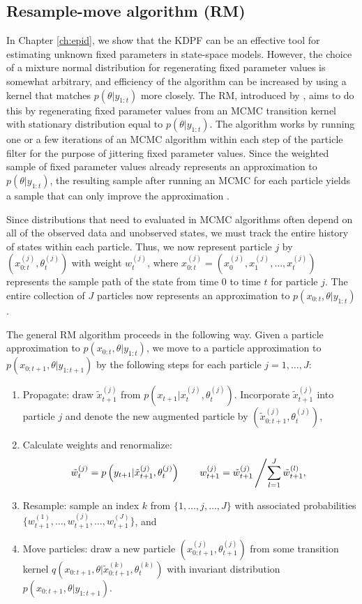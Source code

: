 \subsection{Resample-move algorithm (RM)} \label{sec:rm}

In Chapter \ref{ch:epid}, we show that the KDPF can be an effective tool for estimating unknown fixed parameters in state-space models. However, the choice of a mixture normal distribution for regenerating fixed parameter values is somewhat arbitrary, and efficiency of the algorithm can be increased by using a kernel that matches $p(\theta|y_{1:t})$ more closely. The RM, introduced by \citet{Gilk:Berz:foll:2001}, aims to do this by regenerating fixed parameter values from an MCMC transition kernel with stationary distribution equal to $p(\theta|y_{1:t})$. The algorithm works by running one or a few iterations of an MCMC algorithm within each step of the particle filter for the purpose of jittering fixed parameter values. Since the weighted sample of fixed parameter values already represents an approximation to $p(\theta|y_{1:t})$, the resulting sample after running an MCMC for each particle yields a sample that can only improve the approximation \cite[Section 4.4][]{douc:joh:tut:2009}.

Since distributions that need to evaluated in MCMC algorithms often depend on all of the observed data and unobserved states, we must track the entire history of states within each particle. Thus, we now represent particle $j$ by $\left(x_{0:t}^{(j)},\theta_t^{(j)}\right)$ with weight $w_t^{(j)}$, where $x_{0:t}^{(j)} = \left(x_0^{(j)},x_1^{(j)},\ldots,x_t^{(j)}\right)$ represents the sample path of the state from time 0 to time $t$ for particle $j$. The entire collection of $J$ particles now represents an approximation to $p(x_{0:t},\theta|y_{1:t})$.

The general RM algorithm proceeds in the following way. Given a particle approximation to $p(x_{0:t},\theta|y_{1:t})$, we move to a particle approximation to $p(x_{0:t+1},\theta|y_{1:t+1})$ by the following steps for each particle $j=1,\ldots,J$:
\begin{enumerate}
\item Propagate: draw $\tilde{x}^{(j)}_{t+1}$ from $p\left(x_{t+1}|x^{(j)}_t,\theta^{(j)}_t\right)$. Incorporate $\tilde{x}^{(j)}_{t+1}$ into particle $j$ and denote the new augmented particle by $\left(\tilde{x}^{(j)}_{0:t+1},\theta^{(j)}_t\right)$,
\item Calculate weights and renormalize:
    \[\tilde{w}^{(j)}_t = p\left(y_{t+1}|\tilde{x}^{(j)}_{t+1},\theta^{(j)}_t\right) \qquad w^{(j)}_{t+1} = \tilde{w}_{t+1}^{(j)}\left/\sum_{l=1}^J \tilde{w}_{t+1}^{(l)}, \right.\]
\item Resample: sample an index $k$ from $\{1,\ldots,j,\ldots,J\}$ with associated probabilities $\{w^{(1)}_{t+1},\ldots,w^{(j)}_{t+1},\ldots,w^{(J)}_{t+1}\}$, and
\item \label{step:move} Move particles: draw a new particle $\left(x^{(j)}_{0:t+1},\theta^{(j)}_{t+1}\right)$ from some transition kernel $q\left(x_{0:t+1},\theta|\tilde{x}^{(k)}_{0:t+1},\theta^{(k)}_t\right)$ with invariant distribution $p(x_{0:t+1},\theta|y_{1:t+1})$.
\end{enumerate}

